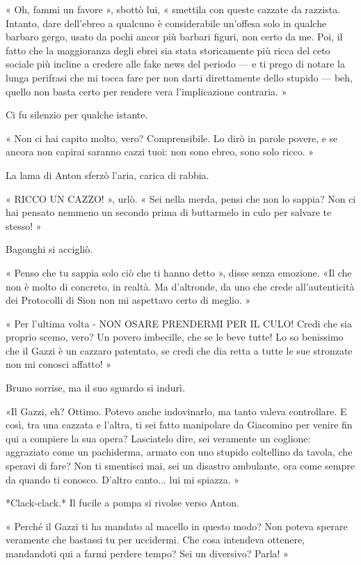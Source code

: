 « Oh, fammi un favore », sbottò lui, « smettila con queste cazzate da razzista. Intanto, dare dell'ebreo a qualcuno è considerabile un'offesa solo in qualche barbaro gergo, usato da pochi ancor più barbari figuri, non certo da me. Poi, il fatto che la maggioranza degli ebrei sia stata storicamente più ricca del ceto sociale più incline a credere alle fake news del periodo --- e ti prego di notare la lunga perifrasi che mi tocca fare per non darti direttamente dello stupido --- beh, quello non basta certo per rendere vera l'implicazione contraria. »

Ci fu silenzio per qualche istante.

« Non ci hai capito molto, vero? Comprensibile. Lo dirò in parole povere, e se ancora non capirai saranno cazzi tuoi: non sono ebreo, sono solo ricco. »

La lama di Anton sferzò l'aria, carica di rabbia.

« RICCO UN CAZZO! », urlò. « Sei nella merda, pensi che non lo sappia? Non ci hai pensato nemmeno un secondo prima di buttarmelo in culo per salvare te stesso! »

Bagonghi si accigliò.

« Penso che tu sappia solo ciò che ti hanno detto », disse senza emozione. «Il che non è molto di concreto, in realtà. Ma d'altronde, da uno che crede all'autenticità dei Protocolli di Sion non mi aspettavo certo di meglio. »

« Per l'ultima volta - NON OSARE PRENDERMI PER IL CULO! Credi che sia proprio scemo, vero? Un povero imbecille, che se le beve tutte! Lo so benissimo che il Gazzi è un cazzaro patentato, se credi che dia retta a tutte le sue stronzate non mi conosci affatto! »

Bruno sorrise, ma il suo sguardo si indurì.

«Il Gazzi, eh? Ottimo. Potevo anche indovinarlo, ma tanto valeva controllare. E così, tra una cazzata e l'altra, ti sei fatto manipolare da Giacomino per venire fin qui a compiere la sua opera? Lasciatelo dire, sei veramente un coglione: aggraziato come un pachiderma, armato con uno stupido coltellino da tavola, che speravi di fare? Non ti smentisci mai, sei un disastro ambulante, ora come sempre da quando ti conosco. D'altro canto... lui mi spiazza. »

*Clack-clack.* Il fucile a pompa si rivolse verso Anton.

« Perché il Gazzi ti ha mandato al macello in questo modo? Non poteva sperare veramente che bastassi tu per uccidermi. Che cosa intendeva ottenere, mandandoti qui a farmi perdere tempo? Sei un diversivo? Parla! »

